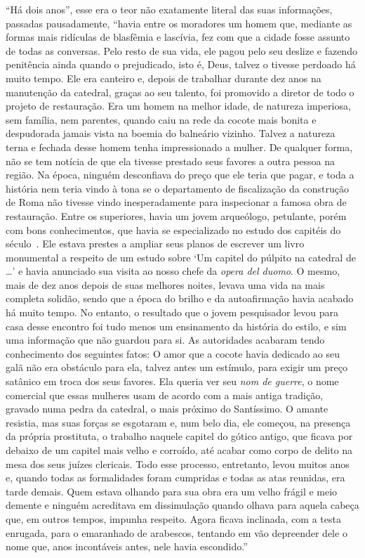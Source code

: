 ``Há dois anos'', esse era o teor não exatamente literal das suas
informações, passadas pausadamente, ``havia entre os moradores um homem
que, mediante as formas mais ridículas de blasfêmia e lascívia, fez com
que a cidade fosse assunto de todas as conversas. Pelo resto de sua
vida, ele pagou pelo seu deslize e fazendo penitência ainda quando o
prejudicado, isto é, Deus, talvez o tivesse perdoado há muito tempo. Ele
era canteiro e, depois de trabalhar durante dez anos na manutenção da
catedral, graças ao seu talento, foi promovido a diretor de todo o
projeto de restauração. Era um homem na melhor idade, de natureza
imperiosa, sem família, nem parentes, quando caiu na rede da cocote mais
bonita e despudorada jamais vista na boemia do balneário vizinho. Talvez
a natureza terna e fechada desse homem tenha impressionado a mulher. De
qualquer forma, não se tem notícia de que ela tivesse prestado seus
favores a outra pessoa na região. Na época, ninguém desconfiava do preço
que ele teria que pagar, e toda a história nem teria vindo à tona se o
departamento de fiscalização da construção de Roma não tivesse vindo
inesperadamente para inspecionar a famosa obra de restauração. Entre os
superiores, havia um jovem arqueólogo, petulante, porém com bons
conhecimentos, que havia se especializado no estudo dos capitéis do
século~. Ele estava prestes a ampliar seus planos de escrever um
livro monumental a respeito de um estudo sobre `Um capitel do púlpito na
catedral de \ldots{}' e havia anunciado sua visita ao nosso chefe da
\emph{opera del duomo}. O mesmo, mais de dez anos depois de suas
melhores noites, levava uma vida na mais completa solidão, sendo que a
época do brilho e da autoafirmação havia acabado há muito tempo. No
entanto, o resultado que o jovem pesquisador levou para casa desse
encontro foi tudo menos um ensinamento da história do estilo, e sim uma
informação que não guardou para si. As autoridades acabaram tendo
conhecimento dos seguintes fatos: O amor que a cocote havia dedicado ao
seu galã não era obstáculo para ela, talvez antes um estímulo, para
exigir um preço satânico em troca dos seus favores. Ela queria ver seu
\emph{nom de guerre}, o nome comercial que essas mulheres usam de acordo
com a mais antiga tradição, gravado numa pedra da catedral, o mais
próximo do Santíssimo. O amante resistia, mas suas forças se esgotaram
e, num belo dia, ele começou, na presença da própria prostituta, o
trabalho naquele capitel do gótico antigo, que ficava por debaixo de um
capitel mais velho e corroído, até acabar como corpo de delito na mesa
dos seus juízes clericais. Todo esse processo, entretanto, levou muitos
anos e, quando todas as formalidades foram cumpridas e todas as atas
reunidas, era tarde demais. Quem estava olhando para sua obra era um
velho frágil e meio demente e ninguém acreditava em dissimulação quando
olhava para aquela cabeça que, em outros tempos, impunha respeito. Agora
ficava inclinada, com a testa enrugada, para o emaranhado de arabescos,
tentando em vão depreender dele o nome que, anos incontáveis antes, nele
havia escondido.''

